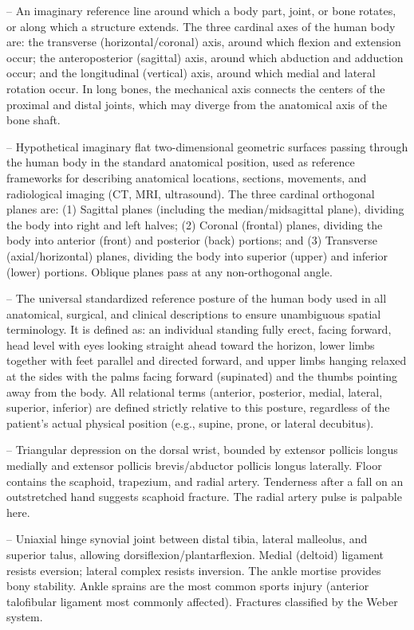 -- An imaginary reference line around which a body part, joint, or bone rotates, or along which a structure extends. The three cardinal axes of the human body are: the transverse (horizontal/coronal) axis, around which flexion and extension occur; the anteroposterior (sagittal) axis, around which abduction and adduction occur; and the longitudinal (vertical) axis, around which medial and lateral rotation occur. In long bones, the mechanical axis connects the centers of the proximal and distal joints, which may diverge from the anatomical axis of the bone shaft.

-- Hypothetical imaginary flat two-dimensional geometric surfaces passing through the human body in the standard anatomical position, used as reference frameworks for describing anatomical locations, sections, movements, and radiological imaging (CT, MRI, ultrasound). The three cardinal orthogonal planes are: (1) Sagittal planes (including the median/midsagittal plane), dividing the body into right and left halves; (2) Coronal (frontal) planes, dividing the body into anterior (front) and posterior (back) portions; and (3) Transverse (axial/horizontal) planes, dividing the body into superior (upper) and inferior (lower) portions. Oblique planes pass at any non-orthogonal angle.

-- The universal standardized reference posture of the human body used in all anatomical, surgical, and clinical descriptions to ensure unambiguous spatial terminology. It is defined as: an individual standing fully erect, facing forward, head level with eyes looking straight ahead toward the horizon, lower limbs together with feet parallel and directed forward, and upper limbs hanging relaxed at the sides with the palms facing forward (supinated) and the thumbs pointing away from the body. All relational terms (anterior, posterior, medial, lateral, superior, inferior) are defined strictly relative to this posture, regardless of the patient's actual physical position (e.g., supine, prone, or lateral decubitus).

-- Triangular depression on the dorsal wrist, bounded by extensor pollicis longus medially and extensor pollicis brevis/abductor pollicis longus laterally. Floor contains the scaphoid, trapezium, and radial artery. Tenderness after a fall on an outstretched hand suggests scaphoid fracture. The radial artery pulse is palpable here.

-- Uniaxial hinge synovial joint between distal tibia, lateral malleolus, and superior talus, allowing dorsiflexion/plantarflexion. Medial (deltoid) ligament resists eversion; lateral complex resists inversion. The ankle mortise provides bony stability. Ankle sprains are the most common sports injury (anterior talofibular ligament most commonly affected). Fractures classified by the Weber system.


